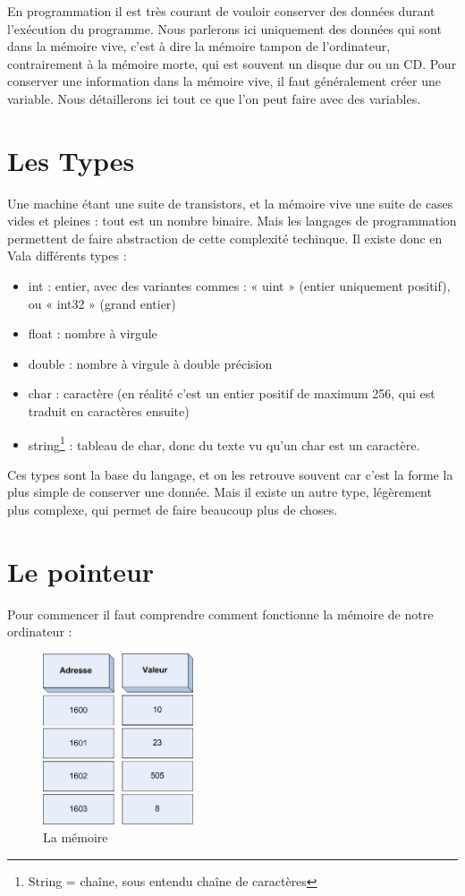 
En programmation il est très courant de vouloir conserver des données durant l'exécution du programme.
Nous parlerons ici uniquement des données qui sont dans la mémoire vive, c'est à dire la mémoire tampon 
de l'ordinateur, contrairement à la mémoire morte, qui est souvent un disque dur ou un CD.
Pour conserver une information dans la mémoire vive, il faut généralement créer une variable. Nous détaillerons 
ici tout ce que l'on peut faire avec des variables.

\section{Les Types}
\label{DefTypes}
Une machine étant une suite de transistors, et la mémoire vive une suite de cases vides et pleines :
tout est un nombre binaire. Mais les langages de programmation permettent de faire abstraction de cette complexité techinque.
Il existe donc en Vala différents types : 
\begin{itemize}
  \item int : entier, avec des variantes commes : « uint » (entier uniquement positif), ou « int32 » (grand entier)
  \item float : nombre à virgule 
  \item double : nombre à virgule à double précision
  \item char : caractère (en réalité c'est un entier positif de maximum 256, qui est traduit en caractères ensuite)
  \item string\footnote{String = chaîne, sous entendu chaîne de caractères} : tableau de char, donc du texte vu qu'un char est un caractère.
\end{itemize}

Ces types sont la base du langage, et on les retrouve souvent car c'est la forme la plus simple de conserver une donnée.
Mais il existe un autre type, légèrement plus complexe, qui permet de faire beaucoup plus de choses.

\section{Le pointeur}
Pour commencer il faut comprendre comment fonctionne la mémoire de notre ordinateur : 
\begin{figure}[H]
  \begin{center}
	  \includegraphics[width=12em]{Annexes/Images/tableau.png}
	\end{center}
	\caption{La mémoire}
\end{figure}

